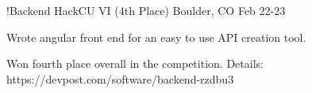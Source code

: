 

\begin{cventries}
\cventry
{!Backend} %
{HackCU VI (4th Place)} %
{Boulder, CO} %
{Feb 22-23} %
{
  \begin{cvitems} %
    \item {Wrote angular front end for an easy to use API creation tool.}
    \item {Won fourth place overall in the competition. Details: https://devpost.com/software/backend-rzdbu3}
    \end{cvitems}
}


\end{cventries}
